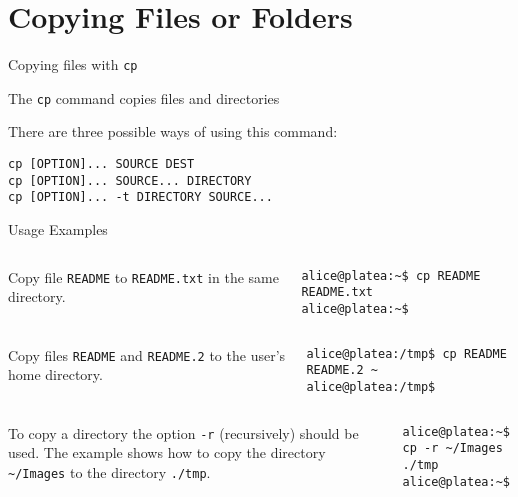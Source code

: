 \section{Copying Files or Folders}
\begin{frame}[fragile]{Copying files with \alert{\texttt{cp}}}


  \begin{block}{The  \texttt{cp} command copies files and directories}
    {\footnotesize
      There are three possible ways of using this command:
    

      \begin{lstlisting}
cp [OPTION]... SOURCE DEST
cp [OPTION]... SOURCE... DIRECTORY
cp [OPTION]... -t DIRECTORY SOURCE...
      \end{lstlisting}
 

  Usage Examples
}

  {\scriptsize

  \begin{columns}[T]
      Copy file \texttt{README} to
      \texttt{README.txt} in the same directory.
        \hspace{-3cm}
        \begin{lstlisting}
alice@platea:~$ cp README README.txt
alice@platea:~$ 
        \end{lstlisting}
    \end{columns}
  \begin{columns}[T]
       Copy files \texttt{README} and
      \texttt{README.2} to the user's home directory.
        \hspace{-3cm}
        \begin{lstlisting}
alice@platea:/tmp$ cp README README.2 ~
alice@platea:/tmp$ 
        \end{lstlisting}
    \end{columns}
  \begin{columns}[T]
       To copy a directory the option
    \texttt{-r} (recursively) should be used. The example shows how to
    copy the directory
    \texttt{\textasciitilde/Images} to the directory \texttt{./tmp}.
        \hspace{-3cm}
        \begin{lstlisting}
alice@platea:~$ cp -r ~/Images ./tmp
alice@platea:~$
        \end{lstlisting}
    \end{columns}
}
  \end{block}
  
\end{frame}
